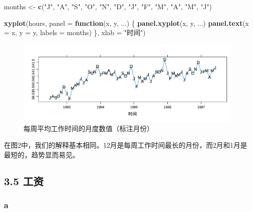 \documentclass[
]{article}
\newenvironment{Shaded}{\begin{snugshade}}{\end{snugshade}}
\newcommand{\AttributeTok}[1]{\textcolor[rgb]{0.13,0.29,0.53}{#1}}
\newcommand{\ControlFlowTok}[1]{\textcolor[rgb]{0.13,0.29,0.53}{\textbf{#1}}}
\newcommand{\FunctionTok}[1]{\textcolor[rgb]{0.13,0.29,0.53}{\textbf{#1}}}
\newcommand{\NormalTok}[1]{#1}
\newcommand{\OtherTok}[1]{\textcolor[rgb]{0.56,0.35,0.01}{#1}}
\newcommand{\StringTok}[1]{\textcolor[rgb]{0.31,0.60,0.02}{#1}}
\begin{document}
\begin{Shaded}
\begin{Highlighting}[]
\NormalTok{months }\OtherTok{\textless{}{-}} \FunctionTok{c}\NormalTok{(}\StringTok{"J"}\NormalTok{, }\StringTok{"A"}\NormalTok{, }\StringTok{"S"}\NormalTok{, }\StringTok{"O"}\NormalTok{, }\StringTok{"N"}\NormalTok{, }\StringTok{"D"}\NormalTok{, }\StringTok{"J"}\NormalTok{, }\StringTok{"F"}\NormalTok{, }\StringTok{"M"}\NormalTok{, }\StringTok{"A"}\NormalTok{, }\StringTok{"M"}\NormalTok{, }\StringTok{"J"}\NormalTok{)}

\FunctionTok{xyplot}\NormalTok{(hours, }\AttributeTok{panel =} \ControlFlowTok{function}\NormalTok{(x, y, ...) \{}
  \FunctionTok{panel.xyplot}\NormalTok{(x, y, ...)}
  \FunctionTok{panel.text}\NormalTok{(}\AttributeTok{x =}\NormalTok{ x, }\AttributeTok{y =}\NormalTok{ y, }\AttributeTok{labels =}\NormalTok{ months)}
\NormalTok{\}, }\AttributeTok{xlab =} \StringTok{"时间"}\NormalTok{)}
\end{Highlighting}
\end{Shaded}

\begin{figure}
\centering
\includegraphics{chapter3_files/figure-latex/unnamed-chunk-2-1.pdf}
\caption{\label{fig:unnamed-chunk-2}每周平均工作时间的月度数值（标注月份）}
\end{figure}

在图2中，我们的解释基本相同。12月是每周工作时间最长的月份，而2月和1月是最短的，趋势显而易见。

\hypertarget{ux5de5ux8d44}{%
\subsection{3.5 工资}\label{ux5de5ux8d44}}

\hypertarget{a-1}{%
\subsubsection*{a}\label{a-1}}
\end{document}
